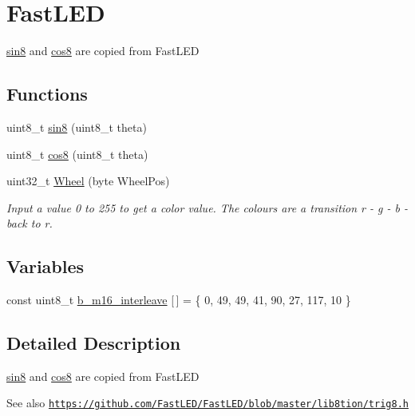 \hypertarget{group___fast_l_e_d}{}\section{Fast\+L\+ED}
\label{group___fast_l_e_d}


\hyperlink{group___fast_l_e_d_ga538b510f61cc75c8e4491f9f2797ee7c}{sin8} and \hyperlink{group___fast_l_e_d_ga007b62e82ea1556ea7b0e3d2656bce09}{cos8} are copied from Fast\+L\+ED  


\subsection*{Functions}
\begin{DoxyCompactItemize}
\item 
uint8\+\_\+t \hyperlink{group___fast_l_e_d_ga538b510f61cc75c8e4491f9f2797ee7c}{sin8} (uint8\+\_\+t theta)
\item 
uint8\+\_\+t \hyperlink{group___fast_l_e_d_ga007b62e82ea1556ea7b0e3d2656bce09}{cos8} (uint8\+\_\+t theta)
\item 
uint32\+\_\+t \hyperlink{group___fast_l_e_d_ga953424274959481c9d46b57d249b3722}{Wheel} (byte Wheel\+Pos)
\begin{DoxyCompactList}\small\item\em Input a value 0 to 255 to get a color value. The colours are a transition r -\/ g -\/ b -\/ back to r. \end{DoxyCompactList}\end{DoxyCompactItemize}
\subsection*{Variables}
\begin{DoxyCompactItemize}
\item 
const uint8\+\_\+t \hyperlink{group___fast_l_e_d_gadc654138105ff193df0fbc7a0c21806c}{b\+\_\+m16\+\_\+interleave} \mbox{[}$\,$\mbox{]} = \{ 0, 49, 49, 41, 90, 27, 117, 10 \}
\end{DoxyCompactItemize}


\subsection{Detailed Description}
\hyperlink{group___fast_l_e_d_ga538b510f61cc75c8e4491f9f2797ee7c}{sin8} and \hyperlink{group___fast_l_e_d_ga007b62e82ea1556ea7b0e3d2656bce09}{cos8} are copied from Fast\+L\+ED 

\begin{DoxySeeAlso}{See also}
\href{https://github.com/FastLED/FastLED/blob/master/lib8tion/trig8.h}{\tt https\+://github.\+com/\+Fast\+L\+E\+D/\+Fast\+L\+E\+D/blob/master/lib8tion/trig8.\+h} 
\end{DoxySeeAlso}


